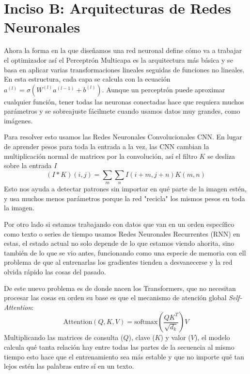 \section{Inciso B: Arquitecturas de Redes Neuronales}

Ahora la forma en la que diseñamos una red neuronal define cómo va a trabajar el optimizador así el Perceptrón Multicapa es la arquitectura más básica y se basa en aplicar varias transformaciones lineales seguidas de funciones no lineales. En esta estructura, cada capa se calcula con la ecuación $a^{(l)} = \sigma(W^{(l)} a^{(l-1)} + b^{(l)})$. Aunque un perceptrón puede aproximar cualquier función, tener todas las neuronas conectadas hace que requiera muchos parámetros y se sobreajuste fácilmete cuando usamos datos muy grandes, como imágenes.

Para resolver esto usamos las Redes Neuronales Convolucionales CNN. En lugar de aprender pesos para toda la entrada a la vez, las CNN cambian la multiplicación normal de matrices por la convolución, así el filtro $K$ se desliza sobre la entrada $I$
\begin{equation}
    (I * K)(i, j) = \sum_{m} \sum_{n} I(i+m, j+n) K(m, n)
\end{equation}
Esto nos ayuda a detectar patrones sin importar en qué parte de la imagen estén, y usa muchos menos parámetros porque la red "recicla" los mismos pesos en toda la imagen.

Por otro lado si estamos trabajando con datos que van en un orden específico como texto o series de tiempo usamos Redes Neuronales Recurrentes (RNN) en estas, el estado actual no solo depende de lo que estamos viendo ahorita, sino también de lo que se vio antes, funcionando como una especie de memoria con ell problema de que al entrenarlas los gradientes tienden a desvanecerse y la red olvida rápido las cosas del pasado.

De este nuevo problema es de donde nacen los Transformers, que no necesitan procesar las cosas en orden su base es que el mecanismo de atención global \textit{Self-Attention}:
\begin{equation}
    \text{Attention}(Q, K, V) = \text{softmax}\left(\frac{QK^T}{\sqrt{d_k}}\right)V
\end{equation}
Multiplicando las matrices de consulta ($Q$), clave ($K$) y valor ($V$), el modelo calcula qué tanta relación hay entre todas las partes de la secuencia al mismo tiempo esto hace que el entrenamiento sea más estable y que no importe qué tan lejos estén las palabras entre sí en un texto.

